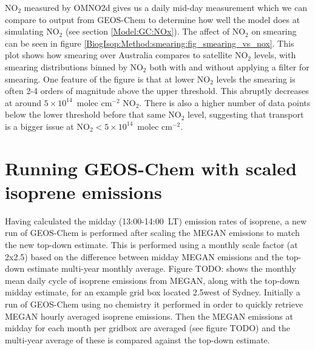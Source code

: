       NO$_2$ measured by OMNO2d gives us a daily mid-day measurement which we can compare to output from GEOS-Chem to determine how well the model does at simulating NO$_2$ (see section \ref{Model:GC:NOx}).
      The affect of NO$_2$ on smearing can be seen in figure \ref{BiogIsop:Method:smearing:fig_smearing_vs_nox}.
      This plot shows how smearing over Australia compares to satellite NO$_2$ levels, with smearing distributions binned by NO$_2$ both with and without applying a filter for smearing.
      One feature of the figure is that at lower NO$_2$ levels the smearing is often 2-4 orders of magnitude above the upper threshold. 
      This abruptly decreases at around $5 \times 10^{14} $~molec cm$^{-2}$ NO$_2$.
      There is also a higher number of data points below the lower threshold before that same NO$_2$ level, suggesting that transport is a bigger issue at NO$_2 < 5 \times 10^{14} $~molec cm$^{-2}$. 
      

\section{Running GEOS-Chem with scaled isoprene emissions}
\label{BioIsop:ScaledRun}
  
  Having calculated the midday (13:00-14:00~LT) emission rates of isoprene, a new run of GEOS-Chem is performed after scaling the MEGAN emissions to match the new top-down estimate.
  This is performed using a monthly scale factor (at 2x2.5\degr) based on the difference between midday MEGAN emissions and the top-down estimate multi-year monthly average.
  Figure TODO: shows the monthly mean daily cycle of isoprene emissions from MEGAN, along with the top-down midday estimate, for an example grid box located 2.5\degr west of Sydney.
  Initially a run of GEOS-Chem using no chemistry it performed in order to quickly retrieve MEGAN hourly averaged isoprene emissions.
  Then the MEGAN emissions at midday for each month per gridbox are averaged (see figure TODO) and the multi-year average of these is compared against the top-down estimate.
  
